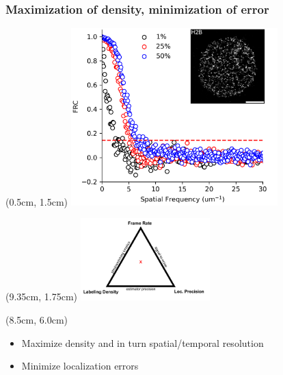 \documentclass{beamer}					%
\begin{document}

\begin{frame}
\frametitle{Maximization of density, minimization of error}

\begin{textblock*}{8cm}(0.5cm, 1.5cm)
\includegraphics[width=8cm]{../../dissertation/dissertation/media/FRC.png}
\end{textblock*}

\begin{textblock*}{5cm}(9.35cm, 1.75cm)
\includegraphics[width=5cm]{../../dissertation/dissertation/media/Tradeoff.png}
\end{textblock*}


\begin{textblock*}{6cm}(8.5cm, 6.0cm)
\begin{itemize}
\item Maximize density and in turn spatial/temporal resolution
\item Minimize localization errors 
\end{itemize}
\end{textblock*}

\end{frame}
\end{document}
